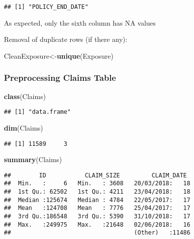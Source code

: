 \documentclass[]{article}
\newenvironment{Shaded}{\begin{snugshade}}{\end{snugshade}}
\newcommand{\KeywordTok}[1]{\textcolor[rgb]{0.13,0.29,0.53}{\textbf{#1}}}
\newcommand{\NormalTok}[1]{#1}
\begin{document}
\begin{verbatim}
## [1] "POLICY_END_DATE"
\end{verbatim}

As expected, only the sixth column has NA values

Removal of duplicate rows (if there any):

\begin{Shaded}
\begin{Highlighting}[]
\NormalTok{CleanExposure<-}\KeywordTok{unique}\NormalTok{(Exposure)}
\end{Highlighting}
\end{Shaded}

\subsubsection{Preprocessing Claims
Table}\label{preprocessing-claims-table}

\begin{Shaded}
\begin{Highlighting}[]
\KeywordTok{class}\NormalTok{(Claims)}
\end{Highlighting}
\end{Shaded}

\begin{verbatim}
## [1] "data.frame"
\end{verbatim}

\begin{Shaded}
\begin{Highlighting}[]
\KeywordTok{dim}\NormalTok{(Claims)}
\end{Highlighting}
\end{Shaded}

\begin{verbatim}
## [1] 11589     3
\end{verbatim}

\begin{Shaded}
\begin{Highlighting}[]
\KeywordTok{summary}\NormalTok{(Claims)}
\end{Highlighting}
\end{Shaded}

\begin{verbatim}
##        ID           CLAIM_SIZE         CLAIM_DATE   
##  Min.   :     6   Min.   : 3608   20/03/2018:   18  
##  1st Qu.: 62502   1st Qu.: 4211   23/04/2018:   18  
##  Median :125674   Median : 4784   22/05/2017:   17  
##  Mean   :124708   Mean   : 7776   25/04/2017:   17  
##  3rd Qu.:186548   3rd Qu.: 5390   31/10/2018:   17  
##  Max.   :249975   Max.   :21648   02/06/2018:   16  
##                                   (Other)   :11486
\end{verbatim}
\end{document}

